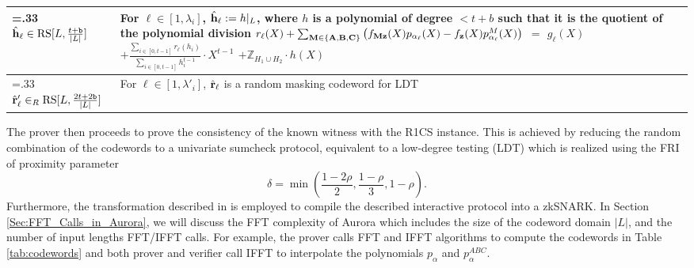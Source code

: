 \begin{table}[]
{\begin{tabularx}{\linewidth}{>{\hsize=.33\hsize}XX}
$\hat{{\bf{h}}}_\ell \in  \text{RS}[L, \frac{t+\texttt{b}}{|L|}]$ & For $\ell\in [1,\lambda_i]$,  $\hat{{\bf{h}}}_\ell := h|_L$, where $h$ is a polynomial of degree $<t+b$ such that it is the quotient of the polynomial division \newline
\(
r_\ell(X) + \sum_{\mathbf{M} \in \{\mathbf{A}, \mathbf{B}, \mathbf{C}\}} \left(f_{\mathbf{Mz}}(X)p_{\alpha_\ell}(X) - f_{\bf{z}}(X) p^{M}_{\alpha_\ell}(X)\right)
\) $=$ $g_\ell(X)$
$ + \frac{\sum_{i\in[0,t-1]}r_\ell(h_i)}{\sum_{i\in[0,t-1]}h_i^{t-1}}\cdot X^{t-1} $
$+ \mathbb{Z}_{H_1\cup H_2} \cdot h(X)$
\\
\midrule
$\hat{{\bf{r}}}'_\ell \in_R  \text{RS}[L, \frac{2t+2\texttt{b}}{|L|}]$ & For $\ell\in [1,\lambda'_i]$, $\hat{{\bf{r}}}_\ell$ is a random masking codeword for LDT
\\
\bottomrule
\end{tabularx}
}
\end{table}
The prover then proceeds to prove the consistency of the known witness with the R1CS instance. This is achieved by reducing the random combination of the codewords to a univariate sumcheck protocol, equivalent to a low-degree testing (LDT) which is realized using the FRI of proximity parameter 
\begin{equation}\label{eq:proximity_parameter}
\delta = \min\left( \frac{1-2\rho}{2}, \frac{1-\rho}{3}, 1-\rho \right).
\end{equation}
Furthermore, the transformation described in \cite{Ben-Sasson2016IOP} is employed to compile the described interactive protocol into a zkSNARK. In Section \ref{Sec:FFT_Calls_in_Aurora}, we will discuss the FFT complexity of Aurora which includes the size of the codeword domain $|L|$, and the number of input lengths FFT/IFFT calls. For example, the prover calls FFT and IFFT algorithms to compute the codewords in Table \ref{tab:codewords} and both prover and verifier call  IFFT  to interpolate the polynomials $p_\alpha$ and $p^{ABC}_\alpha$. 




